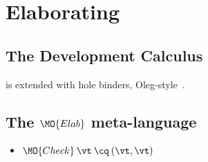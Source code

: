 \section{Elaborating \Idris{}}

\subsection{The Development Calculus \TTdev}

\TTdev{} is \TT{} extended with hole binders, Oleg-style~\cite{McBride1999}. 

\subsection{The $\MO{Elab}$ meta-language}


\begin{itemize}
\item $\MO{Check}\:\vt\:\cq\:(\vt, \vt)$
\end{itemize}

